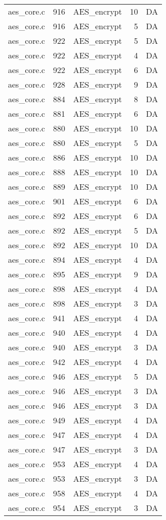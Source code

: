\begin{table}[h!]
\begin{tabular}{lrlrr}
aes\_core.c& 916&AES\_encrypt&10&DA\\
aes\_core.c& 916&AES\_encrypt&5 &DA\\
aes\_core.c& 922&AES\_encrypt&5 &DA\\
aes\_core.c& 922&AES\_encrypt&4 &DA\\
aes\_core.c& 922&AES\_encrypt&6 &DA\\
aes\_core.c& 928&AES\_encrypt&9 &DA\\
aes\_core.c& 884&AES\_encrypt&8 &DA\\
aes\_core.c& 881&AES\_encrypt&6 &DA\\
aes\_core.c& 880&AES\_encrypt&10&DA\\
aes\_core.c& 880&AES\_encrypt&5 &DA\\
aes\_core.c& 886&AES\_encrypt&10&DA\\
aes\_core.c& 888&AES\_encrypt&10&DA\\
aes\_core.c& 889&AES\_encrypt&10&DA\\
aes\_core.c& 901&AES\_encrypt&6 &DA\\
aes\_core.c& 892&AES\_encrypt&6 &DA\\
aes\_core.c& 892&AES\_encrypt&5 &DA\\
aes\_core.c& 892&AES\_encrypt&10&DA\\
aes\_core.c& 894&AES\_encrypt&4 &DA\\
aes\_core.c& 895&AES\_encrypt&9 &DA\\
aes\_core.c& 898&AES\_encrypt&4 &DA\\
aes\_core.c& 898&AES\_encrypt&3 &DA\\
aes\_core.c& 941&AES\_encrypt&4 &DA\\
aes\_core.c& 940&AES\_encrypt&4 &DA\\
aes\_core.c& 940&AES\_encrypt&3 &DA\\
aes\_core.c& 942&AES\_encrypt&4 &DA\\
aes\_core.c& 946&AES\_encrypt&5 &DA\\
aes\_core.c& 946&AES\_encrypt&3 &DA\\
aes\_core.c& 946&AES\_encrypt&3 &DA\\
aes\_core.c& 949&AES\_encrypt&4 &DA\\
aes\_core.c& 947&AES\_encrypt&4 &DA\\
aes\_core.c& 947&AES\_encrypt&3 &DA\\
aes\_core.c& 953&AES\_encrypt&4 &DA\\
aes\_core.c& 953&AES\_encrypt&3 &DA\\
aes\_core.c& 958&AES\_encrypt&4 &DA\\
aes\_core.c& 954&AES\_encrypt&3 &DA\\
\hline
\end{tabular}
\renewcommand{\baselinestretch}{1.0}\selectfont
\end{table}
